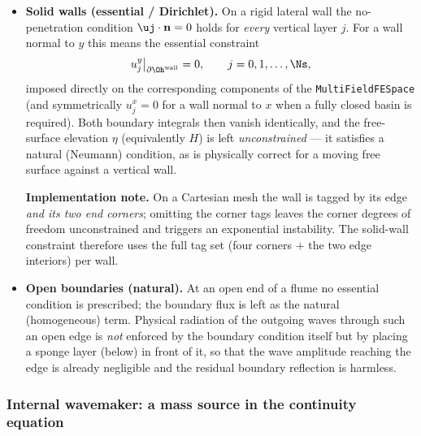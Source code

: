 \begin{itemize}
    \item \textbf{Solid walls (essential / Dirichlet).} On a rigid lateral wall the no-penetration
    condition $\uj\cdot\mathbf{n}=0$ holds for \emph{every} vertical layer $j$. For a wall normal to
    $y$ this means the essential constraint
    \begin{equation*}
        u_j^y\big|_{\partial\Oh^{\text{wall}}} = 0, \qquad j = 0,1,\dots,\Ns,
    \end{equation*}
    imposed directly on the corresponding components of the \texttt{MultiFieldFESpace} (and
    symmetrically $u_j^x=0$ for a wall normal to $x$ when a fully closed basin is required). Both
    boundary integrals then vanish identically, and the free-surface elevation $\eta$ (equivalently
    $H$) is left \emph{unconstrained} --- it satisfies a natural (Neumann) condition, as is physically
    correct for a moving free surface against a vertical wall.

    \textbf{Implementation note.} On a Cartesian mesh the wall is tagged by its edge \emph{and its two
    end corners}; omitting the corner tags leaves the corner degrees of freedom unconstrained and
    triggers an exponential instability. The solid-wall constraint therefore uses the full tag set
    (four corners $+$ the two edge interiors) per wall.

    \item \textbf{Open boundaries (natural).} At an open end of a flume no essential condition is
    prescribed; the boundary flux is left as the natural (homogeneous) term. Physical radiation of
    the outgoing waves through such an open edge is \emph{not} enforced by the boundary condition
    itself but by placing a sponge layer (below) in front of it, so that the wave amplitude reaching
    the edge is already negligible and the residual boundary reflection is harmless.
\end{itemize}

\subsubsection*{Internal wavemaker: a mass source in the continuity equation}

